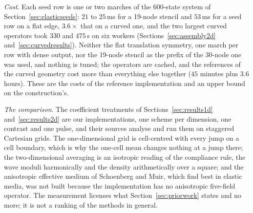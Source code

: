 \documentclass[11pt]{amsart}
\theoremstyle{definition}
\theoremstyle{remark}
\newcommand{\para}[1]{\par\smallskip\noindent\textit{#1}.\enspace}
\begin{document}
\para{Cost}
Each seed row is one or two marches of the $600$-state system of
Section~\ref{sec:elasticseeds}: $21$ to $25$\,ms for a 19-node stencil
and $53$\,ms for a seed row on a flat edge, $3.6\times$ that on a
curved one, and the two largest curved operators took $330$ and
$475$\,s on six workers (Sections~\ref{sec:assembly2d}
and~\ref{sec:curvedresults}). Neither the flat translation symmetry,
one march per row with dense output, nor the 19-node stencil as the
prefix of the 30-node one was used, and nothing is tuned; the operators
are cached, and the references of the curved geometry cost more than
everything else together ($45$ minutes plus $3.6$ hours). These are the
costs of the reference implementation and an upper bound on the
construction's.

\para{The comparison}
The coefficient treatments of Sections~\ref{sec:results1d}
and~\ref{sec:results2d} are our implementations, one scheme per
dimension, one contrast and one pulse, and their sources analyse and
run them on staggered Cartesian grids. The one-dimensional grid is
cell-centred with every jump on a cell boundary, which is why the
one-cell mean changes nothing at a jump there; the two-dimensional
averaging is an isotropic reading of the compliance rule, the wave
moduli harmonically and the density arithmetically over a square; and
the anisotropic effective medium of Schoenberg and Muir, which
\cite{KoeneWittstenRobertsson2022} find best in elastic media, was not
built because the implementation has no anisotropic five-field
operator. The measurement licenses what Section~\ref{sec:priorwork}
states and no more; it is not a ranking of the methods in general.
\end{document}
